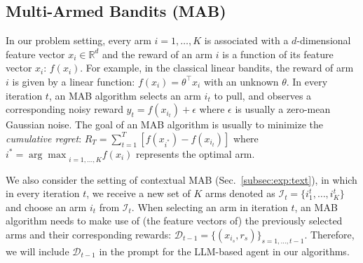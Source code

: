 \subsection{Multi-Armed Bandits (MAB)}
In our problem setting, every arm $i=1,\ldots,K$ is associated with a $d$-dimensional feature vector $x_i\in\mathbb{R}^d$ and the reward of an arm $i$ is a function of its feature vector $x_i$: $f(x_i)$.
For example, in the classical linear bandits, the reward of arm $i$ is given by a linear function: $f(x_i) = \theta^{\top} x_i$ with an unknown $\theta$.
In every iteration $t$, an MAB algorithm selects an arm $i_t$ to pull, and observes a corresponding noisy reward $y_t = f(x_{i_t}) + \epsilon$ where $\epsilon$ is usually a zero-mean Gaussian noise.
The goal of an MAB algorithm is usually to minimize the \emph{cumulative regret}: $R_T = \sum^T_{t=1} [f(x_{i^*}) - f(x_{i_t})]$ where $i^* = {\arg\max}_{i=1,\ldots,K}f(x_{i})$ represents the optimal arm.

We also consider the setting of contextual MAB (Sec.~\ref{subsec:exp:text}), in which in every iteration $t$, we receive a new set of $K$ arms denoted as $\mathcal{I}_t=\{i^t_1,\ldots,i^t_K\}$ and choose an arm $i_t$ from $\mathcal{I}_t$. 
When selecting an arm in iteration $t$, an MAB algorithm needs to make use of (the feature vectors of) the previously selected arms and their corresponding rewards: $\mathcal{D}_{t-1}=\{(x_{i_s}, r_s)\}_{s=1,\ldots,t-1}$.
Therefore, we will include $\mathcal{D}_{t-1}$ in the prompt for the LLM-based agent in our algorithms.


